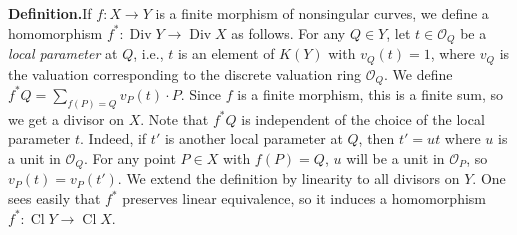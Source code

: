 {\par\smallskip\noindent\textbf{Definition.}\enspace If $f\colon X\to Y$ is a finite morphism of nonsingular curves, we define a homomorphism $f^*\colon\operatorname{Div}Y\to\operatorname{Div}X$ as follows. For any  $Q\in Y$, let $t\in\mathcal O_Q$ be a \emph{local parameter} at $Q$, i.e., $t$ is an element of $K(Y)$ with $v_Q(t)=1$, where $v_Q$ is the valuation corresponding to the discrete valuation ring $\mathcal O_Q$. We define $f^*Q=\sum_{f(P)=Q}v_P(t)\cdot P$. Since $f$ is a finite morphism, this is a finite sum, so we get a divisor on $X$. Note that $f^*Q$ is independent of the choice of the local parameter $t$. Indeed, if $t'$ is another local parameter at $Q$, then $t'=ut$ where $u$ is a unit in $\mathcal O_Q$. For any point $P\in X$ with $f(P)=Q$, $u$ will be a unit in $\mathcal O_P$, so $v_P(t)=v_P(t')$. We extend the definition by linearity to all divisors on $Y$. One sees easily that $f^*$ preserves linear equivalence, so it induces a homomorphism $f^*\colon\operatorname{Cl}Y\to\operatorname{Cl}X$.
}
